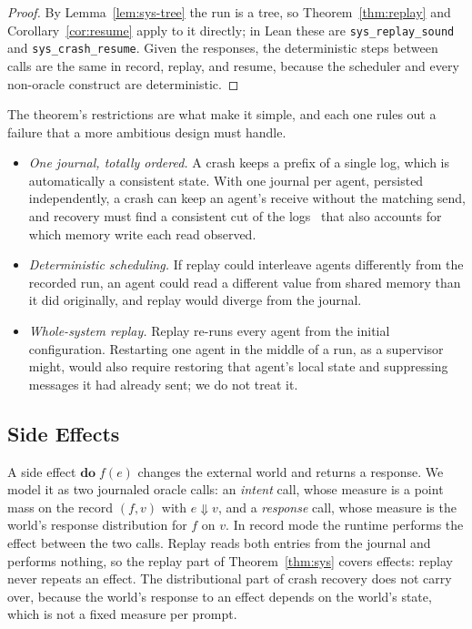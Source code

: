 \begin{proof}
By Lemma~\ref{lem:sys-tree} the run is a tree, so Theorem~\ref{thm:replay} and
Corollary~\ref{cor:resume} apply to it directly; in Lean these are
\texttt{sys\_replay\_sound} and \texttt{sys\_crash\_resume}.
Given the responses, the deterministic steps between calls are the same in record, replay, and
resume, because the scheduler and every non-oracle construct are deterministic.
\end{proof}

\noindent
The theorem's restrictions are what make it simple, and each one rules out a failure that a
more ambitious design must handle.
\begin{itemize}[noitemsep]
  \item \emph{One journal, totally ordered.} A crash keeps a prefix of a single log, which is
    automatically a consistent state. With one journal per agent, persisted independently, a
    crash can keep an agent's receive without the matching send, and recovery must find a
    consistent cut of the logs~\citep{chandy1985snapshots} that also accounts for which memory
    write each read observed.
  \item \emph{Deterministic scheduling.} If replay could interleave agents differently from the
    recorded run, an agent could read a different value from shared memory than it did
    originally, and replay would diverge from the journal.
  \item \emph{Whole-system replay.} Replay re-runs every agent from the initial
    configuration. Restarting one agent in the middle of a run, as a supervisor might, would
    also require restoring that agent's local state and suppressing messages it had already
    sent; we do not treat it.
\end{itemize}

\subsection{Side Effects}
\label{sec:effects}

A side effect $\mathbf{do}\;f(e)$ changes the external world and returns a response.
We model it as two journaled oracle calls: an \emph{intent} call, whose measure is a point mass
on the record $(f, v)$ with $e \Downarrow v$, and a \emph{response} call, whose measure is the
world's response distribution for $f$ on $v$.
In record mode the runtime performs the effect between the two calls.
Replay reads both entries from the journal and performs nothing, so the replay part of
Theorem~\ref{thm:sys} covers effects: replay never repeats an effect.
The distributional part of crash recovery does not carry over, because the world's response to
an effect depends on the world's state, which is not a fixed measure per prompt.

